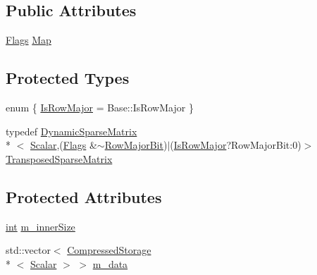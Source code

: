 \subsection*{Public Attributes}
\begin{DoxyCompactItemize}
\item 
\hyperlink{class_sparse_matrix_base_af601f771c204b3ca254a52085525004cadb11b5d4625dc81c28848af1ec6dac18}{Flags} \hyperlink{class_dynamic_sparse_matrix_a3d8ab26ff318f25e40796717685f7a62}{Map}
\end{DoxyCompactItemize}
\subsection*{Protected Types}
\begin{DoxyCompactItemize}
\item 
enum \{ \hyperlink{class_dynamic_sparse_matrix_a47215f6c238780cd57e81e75ab6d4263af7eb92e91c48fdf4583d99c7c3bbd3db}{Is\-Row\-Major} = Base\-:\-:Is\-Row\-Major
 \}
\item 
typedef \hyperlink{class_dynamic_sparse_matrix}{Dynamic\-Sparse\-Matrix}\\*
$<$ \hyperlink{class_sparse_matrix_base_af39d70f2b7e775e9e17b666cd24128c8}{Scalar},(\hyperlink{class_sparse_matrix_base_af601f771c204b3ca254a52085525004cadb11b5d4625dc81c28848af1ec6dac18}{Flags} \&$\sim$\hyperlink{group__flags_ga7bd49e7b260e869e10fb9dc4fd081a85}{Row\-Major\-Bit})$|$(\hyperlink{class_dynamic_sparse_matrix_a47215f6c238780cd57e81e75ab6d4263af7eb92e91c48fdf4583d99c7c3bbd3db}{Is\-Row\-Major}?Row\-Major\-Bit\-:0)$>$ \hyperlink{class_dynamic_sparse_matrix_a17501e94beed85eb9cad33fa5520d398}{Transposed\-Sparse\-Matrix}
\end{DoxyCompactItemize}
\subsection*{Protected Attributes}
\begin{DoxyCompactItemize}
\item 
\hyperlink{ioapi_8h_a787fa3cf048117ba7123753c1e74fcd6}{int} \hyperlink{class_dynamic_sparse_matrix_a647dcdae35dc9c1ff0d0cc0ae1194373}{m\-\_\-inner\-Size}
\item 
std\-::vector$<$ \hyperlink{class_compressed_storage}{Compressed\-Storage}\\*
$<$ \hyperlink{class_sparse_matrix_base_af39d70f2b7e775e9e17b666cd24128c8}{Scalar} $>$ $>$ \hyperlink{class_dynamic_sparse_matrix_a9655a5f37dc37d24df30b047b346529f}{m\-\_\-data}
\end{DoxyCompactItemize}
